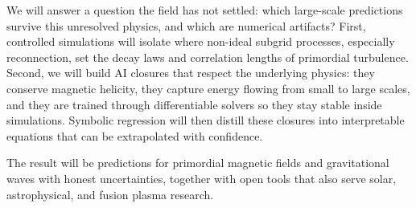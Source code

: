 \documentclass{article}
\begin{document}
We will answer a question the field has not settled: which large-scale predictions survive this unresolved physics, and which are numerical artifacts? First, controlled simulations will isolate where non-ideal subgrid processes, especially reconnection, set the decay laws and correlation lengths of primordial turbulence. Second, we will build AI closures that respect the underlying physics: they conserve magnetic helicity, they capture energy flowing from small to large scales, and they are trained through differentiable solvers so they stay stable inside simulations. Symbolic regression will then distill these closures into interpretable equations that can be extrapolated with confidence.

The result will be predictions for primordial magnetic fields and gravitational waves with honest uncertainties, together with open tools that also serve solar, astrophysical, and fusion plasma research.
\end{document}
